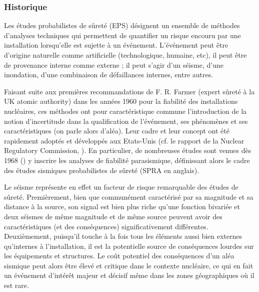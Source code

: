 \subsubsection{Historique}

Les études probabilistes de sûreté (EPS) désignent un ensemble de méthodes d'analyses techniques qui permettent de quantifier un risque encouru par une installation lorsqu'elle est sujette à un événement. L'événement peut être d'origine naturelle comme artificielle (technologique, humaine, etc), il peut être de provenance interne comme externe ; il peut s'agir d'un séisme, d'une inondation, d'une combinaison de défaillances internes, entre autres.  %

Faisant suite aux premières recommandations de F. R. Farmer (expert sûreté à la UK atomic authority) dans les années 1960 pour la fiabilité des installations nucléaires,
ces méthodes ont pour caractéristique commune l'introduction de la notion d'incertitude dans la qualification de l'événement, ses phénomènes et ses caractéristiques (on parle alors d'aléa).
%
%
Leur cadre et leur concept ont été rapidement adoptés et développés aux Etats-Unis (cf. le rapport de la Nuclear Regulatory Commission, \cite{nrc_pra_1983}). En particulier, de nombreuses études sont venues dès 1968 (\cite{cornell_engineering_1968}) 
y inscrire les analyses de fiabilité parasismique, définissant alors le cadre des études sismiques probabilistes de sûreté (SPRA en anglais). %



Le séisme représente en effet un facteur de risque remarquable des études de sûreté.
Premièrement, bien que communément caractérisé par sa magnitude et sa distance à la source, son signal est bien plus riche qu'une fonction bivariée et deux séismes de même magnitude et de même source peuvent avoir des caractéristiques (et des conséquences) significativement différentes.
Deuxièmement, puisqu'il touche à la fois tous les éléments aussi bien externes qu'internes à l'installation, il est la potentielle source de conséquences lourdes sur les équipements et structures.
Le coût potentiel des conséquences d'un aléa sismique peut alors être élevé et critique dans le contexte nucléaire, ce qui en fait un événement d'intérêt majeur et décisif même dans les zones géographiques où il est rare.


